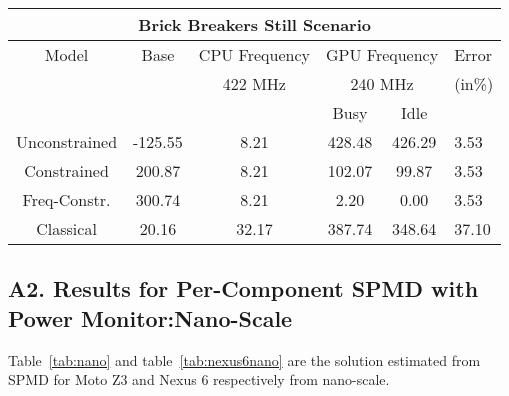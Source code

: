 \begin{table}[]
{\begin{tabular}{|c|c|c|c|c|p{5.4mm}|}
    \multicolumn{6}{|c|}{Brick Breakers Still Scenario} \\
        \hline
        Model & Base & \multicolumn{1}{c|}{CPU Frequency} & \multicolumn{2}{c|}{GPU Frequency} & Error \\
        \cline{3-5}
        &  & 422 MHz & \multicolumn{2}{c|}{240 MHz} & (in\%) \\
        \cline{3-5}
                & & \multicolumn{1}{|c|}{} & Busy & Idle & \\
        \hline
        Unconstrained & -125.55 & 8.21 & 428.48 & 426.29 & 3.53 \\
        Constrained & 200.87 & 8.21 & 102.07 & 99.87 & 3.53 \\
        Freq-Constr. & 300.74 & 8.21 & 2.20 & 0.00 & 3.53 \\
        \hline
        Classical & 20.16 & 32.17 & 387.74 & 348.64 & 37.10 \\
        \hline

\end{tabular}
}
\label{tab:nexus6micro_a}
\vspace{-0.1in}
\end{table}

\subsection*{A2. Results for Per-Component SPMD with Power Monitor:Nano-Scale}

Table~\ref{tab:nano} and table~\ref{tab:nexus6nano} are the solution estimated from SPMD
for Moto Z3 and Nexus 6 respectively from nano-scale.

